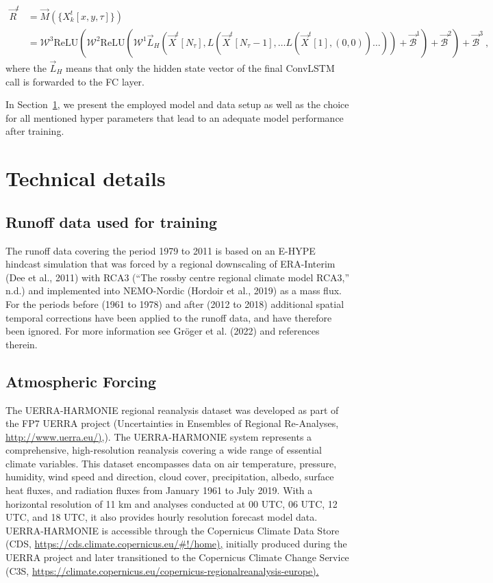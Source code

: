 \documentclass[
]{agujournal2019}
\begin{document}
\[
\begin{aligned}
\vec{R}^t & = \vec{M}(\{X^t_k[x,y,\tau]\}) \\
& = \pmb{\mathcal{W}}^{3}\mathrm{ReLU}\left(\pmb{\mathcal{W}}^{2}\mathrm{ReLU}\left(\pmb{\mathcal{W}}^{1} \vec{L}_H \left( \vec{X}^t[N_\tau], L \left( \vec{X}^t[N_\tau-1], \ldots L \left( \vec{X}^t[1], (0, 0) \right) \ldots \right) \right) + \vec{\mathcal{B}}^1\right) + \vec{\mathcal{B}}^2 \right) + \vec{\mathcal{B}}^3 \ ,
\end{aligned}
\] where the \(\vec{L}_H\) means that only the hidden state vector of
the final ConvLSTM call is forwarded to the FC layer.

In Section~\ref{sec-technical_details}, we present the employed model
and data setup as well as the choice for all mentioned hyper parameters
that lead to an adequate model performance after training.

\section{Technical details}\label{sec-technical_details}

\subsection{Runoff data used for
training}\label{runoff-data-used-for-training}

The runoff data covering the period 1979 to 2011 is based on an E-HYPE
hindcast simulation that was forced by a regional downscaling of
ERA-Interim (Dee et al., 2011) with RCA3 ({``The rossby centre regional
climate model RCA3,''} n.d.) and implemented into NEMO-Nordic (Hordoir
et al., 2019) as a mass flux. For the periods before (1961 to 1978) and
after (2012 to 2018) additional spatial temporal corrections have been
applied to the runoff data, and have therefore been ignored. For more
information see Gröger et al. (2022) and references therein.

\subsection{Atmospheric Forcing}\label{atmospheric-forcing}

The UERRA-HARMONIE regional reanalysis dataset was developed as part of
the FP7 UERRA project (Uncertainties in Ensembles of Regional
Re-Analyses, \href{http://www.uerra.eu/}{http://www.uerra.eu/)},). The
UERRA-HARMONIE system represents a comprehensive, high-resolution
reanalysis covering a wide range of essential climate variables. This
dataset encompasses data on air temperature, pressure, humidity, wind
speed and direction, cloud cover, precipitation, albedo, surface heat
fluxes, and radiation fluxes from January 1961 to July 2019. With a
horizontal resolution of 11 km and analyses conducted at 00 UTC, 06 UTC,
12 UTC, and 18 UTC, it also provides hourly resolution forecast model
data. UERRA-HARMONIE is accessible through the Copernicus Climate Data
Store (CDS, \url{https://cds.climate.copernicus.eu/\#!/home),} initially
produced during the UERRA project and later transitioned to the
Copernicus Climate Change Service (C3S,
\url{https://climate.copernicus.eu/copernicus-regionalreanalysis-europe).}
\end{document}
